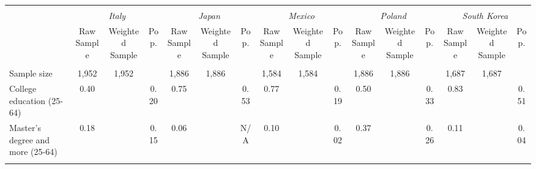 \begin{tabular}{l*{15}{c}}
\toprule
\hline \\[-1.8ex]
\multicolumn{1}{c}{\em{ }} & \multicolumn{3}{c}{\em{Italy}} & \multicolumn{3}{c}{\em{Japan}} & \multicolumn{3}{c}{\em{Mexico}} & \multicolumn{3}{c}{\em{Poland}} & \multicolumn{3}{c}{\em{South Korea}} \\
\cmidrule(l{3pt}r{3pt}){2-4} \cmidrule(l{3pt}r{3pt}){5-7} \cmidrule(l{3pt}r{3pt}){8-10} \cmidrule(l{3pt}r{3pt}){11-13} \cmidrule(l{3pt}r{3pt}){14-16}
\noalign{\smallskip}  & Raw Sample & Weighted Sample & Pop. & Raw Sample & Weighted Sample & Pop. & Raw Sample & Weighted Sample & Pop. & Raw Sample & Weighted Sample & Pop. & Raw Sample & Weighted Sample & Pop. \\
\hline \\[-1.8ex] 
Sample size & 1,952 & 1,952 & & 1,886 & 1,886 & & 1,584 & 1,584 & & 1,886 & 1,886 & & 1,687 & 1,687 & \\
\noalign{\smallskip}\hline \noalign{\smallskip}
College education (25-64) & 0.40 & & 0.20 & 0.75 & & 0.53 & 0.77 & & 0.19 & 0.50 & & 0.33 & 0.83 & & 0.51 \\
Master's degree and more (25-64) & 0.18 & & 0.15 & 0.06 & & N/A & 0.10 & & 0.02 & 0.37 & & 0.26 & 0.11 & & 0.04 \\
\\
\bottomrule
\end{tabular}